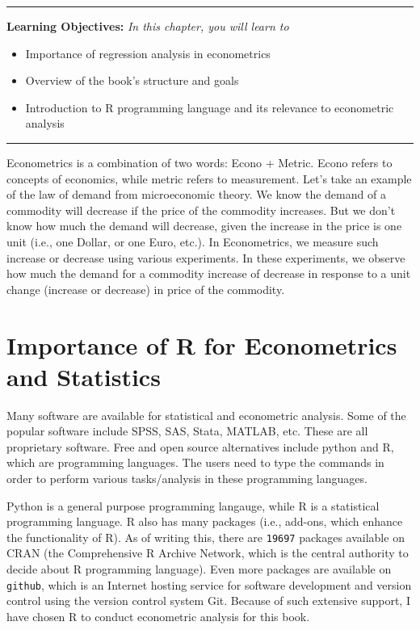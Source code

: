 \documentclass[
  letterpaper,
  paper =a4,
  twoside,
  openright,
  headsepline,
  footsepline,
  listof = totocnumbered,
  chapterprefix = true,
  firstiscover]{scrbook}
\providecommand{\abstractname}{Learning Objectives} %
\newenvironment{objectives}[1]{%
	\hrule
	\vspace{5pt}
	\small\textbf{\abstractname: } 
	\newline
	\vspace{0.1cm}
	\small\emph{#1} %
	\itshape %
}{%
	\vspace{5pt}
	\hrule
	\vspace{0.6cm}
}
\begin{document}
\begin{objectives}{In this chapter, you will learn to}
\begin{itemize}

\item{Importance of regression analysis in econometrics}

\item{Overview of the book's structure and goals}

\item{Introduction to R programming language and its relevance to econometric analysis}

\end{itemize}

\end{objectives}

Econometrics is a combination of two words: Econo + Metric. Econo refers
to concepts of economics, while metric refers to measurement. Let's take
an example of the law of demand from microeconomic theory. We know the
demand of a commodity will decrease if the price of the commodity
increases. But we don't know how much the demand will decrease, given
the increase in the price is one unit (i.e., one Dollar, or one Euro,
etc.). In Econometrics, we measure such increase or decrease using
various experiments. In these experiments, we observe how much the
demand for a commodity increase of decrease in response to a unit change
(increase or decrease) in price of the commodity.

\hypertarget{importance-of-r-for-econometrics-and-statistics}{%
\section{Importance of R for Econometrics and
Statistics}\label{importance-of-r-for-econometrics-and-statistics}}

Many software are available for statistical and econometric analysis.
Some of the popular software include SPSS, SAS, Stata, MATLAB, etc.
These are all proprietary software. Free and open source alternatives
include python and R, which are programming languages. The users need to
type the commands in order to perform various tasks/analysis in these
programming languages.

Python is a general purpose programming langauge, while R is a
statistical programming language. R also has many packages (i.e.,
add-ons, which enhance the functionality of R). As of writing this,
there are \texttt{19697} packages available on CRAN (the Comprehensive R
Archive Network, which is the central authority to decide about R
programming language). Even more packages are available on
\texttt{github}, which is an Internet hosting service for software
development and version control using the version control system Git.
Because of such extensive support, I have chosen R to conduct
econometric analysis for this book.
\end{document}
